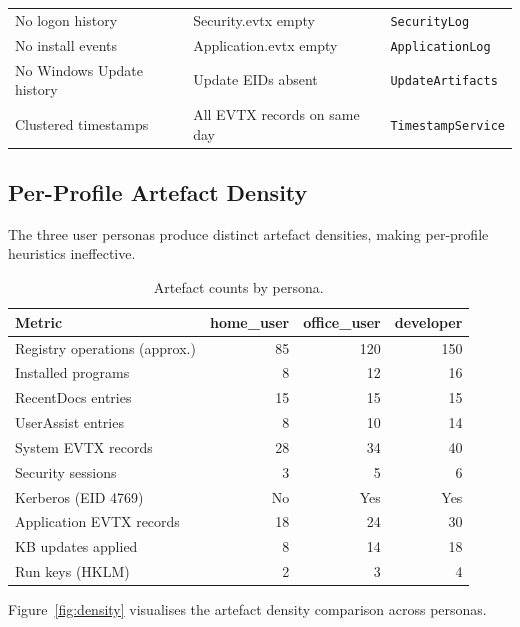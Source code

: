 \documentclass[12pt,a4paper]{article}
\begin{document}
\begin{table}[H]
\begin{tabularx}{\linewidth}{@{}l X l@{}}
No logon history             & Security.evtx empty                               & \texttt{SecurityLog} \\
No install events            & Application.evtx empty                            & \texttt{ApplicationLog} \\
No Windows Update history    & Update EIDs absent                                & \texttt{UpdateArtifacts} \\
Clustered timestamps         & All EVTX records on same day                      & \texttt{TimestampService} \\
\bottomrule
\end{tabularx}
\end{table}

\subsection{Per-Profile Artefact Density}

The three user personas produce distinct artefact densities, making
per-profile heuristics ineffective.

\begin{table}[H]
\centering
\small
\caption{Artefact counts by persona.}
\label{tab:density}
\begin{tabular}{@{}lrrr@{}}
\toprule
\textbf{Metric} & \textbf{home\_user} & \textbf{office\_user} & \textbf{developer} \\
\midrule
Registry operations (approx.) & 85  & 120 & 150 \\
Installed programs            & 8   & 12  & 16  \\
RecentDocs entries            & 15  & 15  & 15  \\
UserAssist entries            & 8   & 10  & 14  \\
System EVTX records           & 28  & 34  & 40  \\
Security sessions             & 3   & 5   & 6   \\
Kerberos (EID 4769)           & No  & Yes & Yes \\
Application EVTX records      & 18  & 24  & 30  \\
KB updates applied            & 8   & 14  & 18  \\
Run keys (HKLM)               & 2   & 3   & 4   \\
\bottomrule
\end{tabular}
\end{table}

Figure~\ref{fig:density} visualises the artefact density comparison across
personas.
\end{document}
